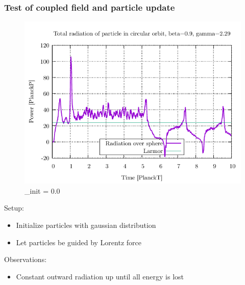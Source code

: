\documentclass[5pt]{beamer}
\begin{document}
\begin{frame}
  \frametitle{Test of coupled field and particle update}
  \begin{minipage}{0.45\textwidth}
    \begin{figure}[h]
      \centering
      \includegraphics[width=\columnwidth]{radplot_lorentz.pdf}
      \caption{\sigma_{init} = 0.0}
      \label{fig:smallvar}
    \end{figure}
  \end{minipage}
  \hfill
  \begin{minipage}{0.5\textwidth}
  
  Setup:
  \begin{itemize}
    \item[\cdot] Initialize particles with gaussian distribution
    \item[\cdot] Let particles be guided by Lorentz force
  \end{itemize} 
  Observations:
  \begin{itemize}
    \item[\cdot] Constant outward radiation up until all energy is lost
  \end{itemize}
\end{minipage}
\end{frame}
\end{document}
